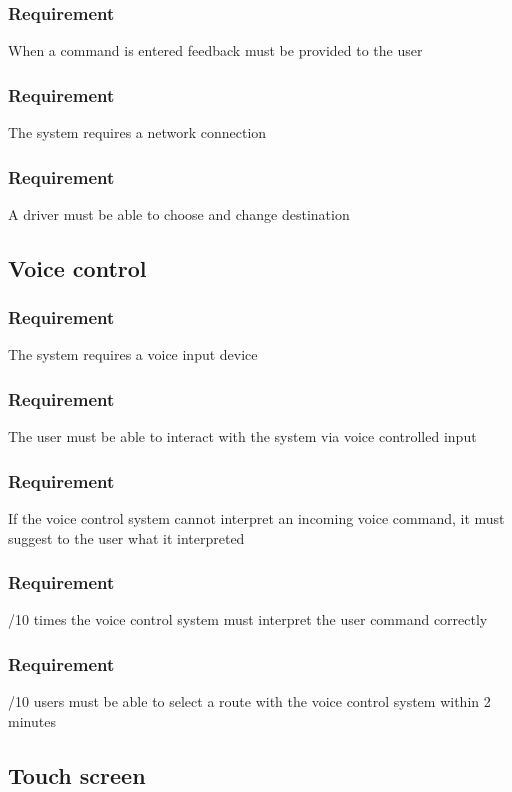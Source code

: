 \documentclass{article}
\begin{document}
{    \subsubsection{Requirement}
\hfill \break 
\- \- \-When a command is entered feedback must be provided to the user
    \subsubsection{Requirement}
\hfill \break 
\- \- \-The system requires a network connection
    \subsubsection{Requirement}
\hfill \break 
\- \- \-A driver must be able to choose and change destination
  \subsection{Voice control}
      \subsubsection{Requirement}
\hfill \break 
\- \- \-The system requires a voice input device
      \subsubsection{Requirement}
\hfill \break 
\- \- \-The user must be able to interact with the system via voice controlled input
      \subsubsection{Requirement}
\hfill \break 
\- \- \-If the voice control system cannot interpret an incoming voice command, it must suggest to the user what it interpreted
      \subsubsection{Requirement}
\hfill \break 
\- \- /10 times the voice control system must interpret the user command correctly
      \subsubsection{Requirement}
\hfill \break 
\- \- /10 users must be able to select a route with the voice control system within 2 minutes
  \subsection{Touch screen}
}
\end{document}
